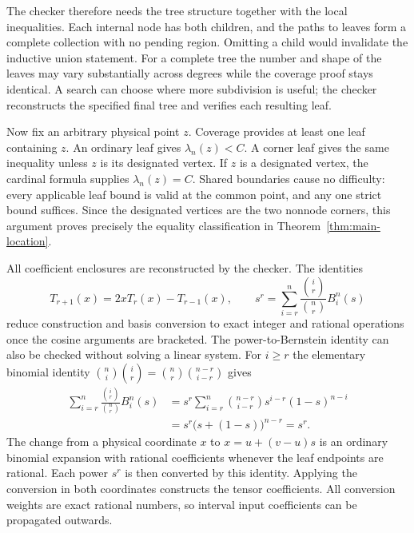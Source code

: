 The checker therefore needs the tree structure together with the local
inequalities. Each internal node has both children, and the paths to
leaves form a complete collection with no pending region. Omitting a
child would invalidate the inductive union statement. For a complete
tree the number and shape of the leaves may vary substantially across
degrees while the coverage proof stays identical. A search can choose
where more subdivision is useful; the checker reconstructs the
specified final tree and verifies each resulting leaf.

Now fix an arbitrary physical point $z$. Coverage provides at least
one leaf containing $z$. An ordinary leaf gives
$\lambda_n(z)<C$. A corner leaf gives the same inequality unless
$z$ is its designated vertex. If $z$ is a designated vertex, the
cardinal formula supplies $\lambda_n(z)=C$. Shared boundaries cause
no difficulty: every applicable leaf bound is valid at the common
point, and any one strict bound suffices. Since the designated
vertices are the two nonnode corners, this argument proves precisely
the equality classification in Theorem~\ref{thm:main-location}.

All coefficient enclosures are reconstructed by the checker. The identities
\[
 T_{r+1}(x)=2xT_r(x)-T_{r-1}(x),\qquad
 s^r=\sum_{i=r}^n\frac{\binom{i}{r}}{\binom nr}B_i^n(s)
\]
reduce construction and basis conversion to exact integer and rational
operations once the cosine arguments are bracketed.
The power-to-Bernstein identity can also be checked without solving a
linear system. For $i\geq r$ the elementary binomial identity
$\binom ni\binom ir=\binom nr\binom{n-r}{i-r}$ gives
\[
 \begin{aligned}
 \sum_{i=r}^n\frac{\binom ir}{\binom nr}B_i^n(s)
 &=s^r\sum_{i=r}^n\binom{n-r}{i-r}
                      s^{i-r}(1-s)^{n-i}\\
 &=s^r\bigl(s+(1-s)\bigr)^{n-r}=s^r.
 \end{aligned}
\]
The change from a physical coordinate $x$ to $x=u+(v-u)s$ is an
ordinary binomial expansion with rational coefficients whenever the
leaf endpoints are rational. Each power $s^r$ is then converted by
this identity. Applying the conversion in both coordinates constructs
the tensor coefficients. All conversion weights are exact rational
numbers, so interval input coefficients can be propagated outwards.

